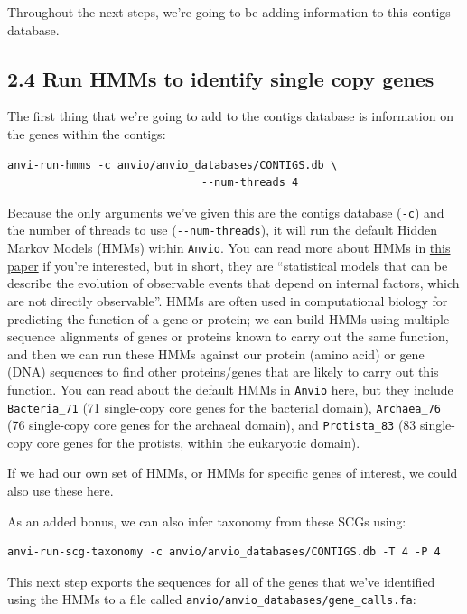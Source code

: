 \documentclass[
]{book}
\begin{document}
Throughout the next steps, we're going to be adding information to this contigs database.

\subsection{2.4 Run HMMs to identify single copy genes}\label{run-hmms-to-identify-single-copy-genes}

The first thing that we're going to add to the contigs database is information on the genes within the contigs:

\begin{verbatim}
anvi-run-hmms -c anvio/anvio_databases/CONTIGS.db \
                              --num-threads 4
\end{verbatim}

Because the only arguments we've given this are the contigs database (\texttt{-c}) and the number of threads to use (\texttt{-\/-num-threads}), it will run the default Hidden Markov Models (HMMs) within \texttt{Anvi\textquotesingle{}o}. You can read more about HMMs in \href{http://eddylab.org/software/hmmer/Userguide.pdf}{this paper} if you're interested, but in short, they are ``statistical models that can be describe the evolution of observable events that depend on internal factors, which are not directly observable''. HMMs are often used in computational biology for predicting the function of a gene or protein; we can build HMMs using multiple sequence alignments of genes or proteins known to carry out the same function, and then we can run these HMMs against our protein (amino acid) or gene (DNA) sequences to find other proteins/genes that are likely to carry out this function. You can read about the default HMMs in \texttt{Anvi\textquotesingle{}o} here, but they include \texttt{Bacteria\_71} (71 single-copy core genes for the bacterial domain), \texttt{Archaea\_76} (76 single-copy core genes for the archaeal domain), and \texttt{Protista\_83} (83 single-copy core genes for the protists, within the eukaryotic domain).

If we had our own set of HMMs, or HMMs for specific genes of interest, we could also use these here.

As an added bonus, we can also infer taxonomy from these SCGs using:

\begin{verbatim}
anvi-run-scg-taxonomy -c anvio/anvio_databases/CONTIGS.db -T 4 -P 4
\end{verbatim}

This next step exports the sequences for all of the genes that we've identified using the HMMs to a file called \texttt{anvio/anvio\_databases/gene\_calls.fa}:
\end{document}
